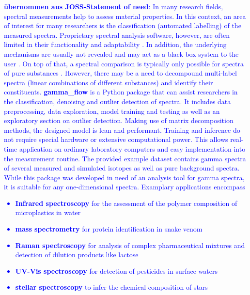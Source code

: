\documentclass[preprint,12pt, a4paper]{elsarticle}
\begin{document}
\textcolor{blue}{\textbf{übernommen aus JOSS-Statement of need}:
In many research fields, spectral measurements help to assess material properties. 
In this context, an area of interest for many researchers is the classification (automated 
labelling) of the measured spectra. Proprietary spectral analysis software, however, are often 
limited in their functionality and adaptability \cite{Lam2011, Nasereddin2023}. 
In addition, the underlying mechanisms are usually not revealed and may act as a black-box 
system to the user \cite{ElAmri2022}. On top of that, a spectral comparison is typically only possible for spectra of pure substances \cite{Cowger2021}. However, there may be a need to decompound multi-label spectra (linear combinations of different substances) and identify their constituents. \newline
\textbf{gamma\_flow} is a Python package that can assist researchers in the classification,
denoising and outlier detection of spectra. It includes data preprocessing, 
data exploration, model training and testing as well as an exploratory section
on outlier detection. 
Making use of matrix decomposition methods, the designed model is lean and performant. 
Training and inference do not require special hardware or extensive computational
power. This allows real-time application on ordinary laboratory computers and 
easy implementation into the measurement routine. 
The provided example dataset contains gamma spectra of several measured and simulated 
isotopes as well as pure background spectra. 
While this package was developed in need of an analysis tool for gamma spectra, 
it is suitable for any one-dimensional spectra.  
Examplary applications encompass  
\begin{itemize}
\item \textbf{Infrared spectroscopy} for the assessment of the polymer composition of 
microplastics in water \cite{Ferreiro2023, Whiting2022}  
\item \textbf{mass spectrometry} for protein identification in snake venom 
\cite{Zelanis2019, Yasemin2021}  
\item \textbf{Raman spectroscopy} for analysis of complex pharmaceutical mixtures and detection
of dilution products like lactose \cite{Fu2021}  
\item \textbf{UV-Vis spectroscopy} for detection of pesticides in surface waters \cite{Guo2020, Qi2024}
\item \textbf{stellar spectroscopy} to infer the chemical composition of stars \cite{Gray2021}  
\end{itemize}
}
\end{document}
